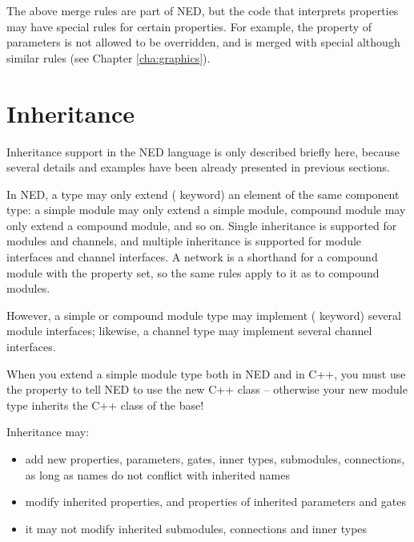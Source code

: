 \begin{note}
    The above merge rules are part of NED, but the code that interprets
    properties may have special rules for certain properties. For example,
    the  property of parameters is not allowed to be overridden,
    and  is merged with special although similar rules
    (see Chapter \ref{cha:graphics}).
\end{note}




\section{Inheritance}
\label{sec:ch-ned-lang:inheritance}

Inheritance support in the NED language is only described briefly here,
because several details and examples have been already presented in
previous sections.

In NED, a type may only extend ( keyword) an element of
the same component type: a simple module may only extend a simple module,
compound module may only extend a compound module, and so on. Single
inheritance is supported for modules and channels, and multiple inheritance
is supported for module interfaces and channel interfaces. A network is a
shorthand for a compound module with the  property set, so
the same rules apply to it as to compound modules.

However, a simple or compound module type may implement (
keyword) several module interfaces; likewise, a channel type may implement
several channel interfaces.

\begin{important}
    When you extend a simple module type both in NED and in C++, you must
    use the  property to tell NED to use the new C++ class --
    otherwise your new module type inherits the C++ class of the base!
\end{important}

Inheritance may:
\begin{itemize}
    \item add new properties, parameters, gates, inner types, submodules,
          connections, as long as names do not conflict with inherited names
    \item modify inherited properties, and properties of inherited parameters and
          gates
    \item it may not modify inherited submodules, connections and inner types
\end{itemize}

